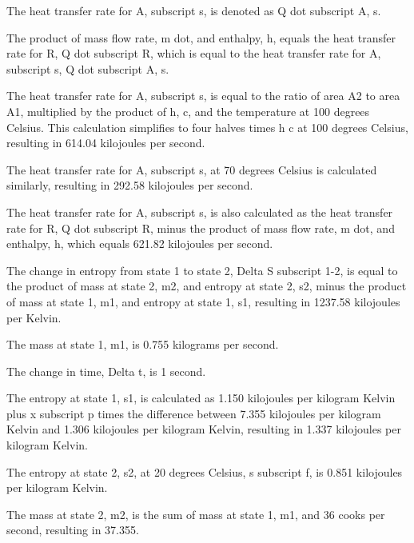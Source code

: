 The heat transfer rate for A, subscript s, is denoted as Q dot subscript A, s.

The product of mass flow rate, m dot, and enthalpy, h, equals the heat transfer rate for R, Q dot subscript R, which is equal to the heat transfer rate for A, subscript s, Q dot subscript A, s.

The heat transfer rate for A, subscript s, is equal to the ratio of area A2 to area A1, multiplied by the product of h, c, and the temperature at 100 degrees Celsius. This calculation simplifies to four halves times h c at 100 degrees Celsius, resulting in 614.04 kilojoules per second.

The heat transfer rate for A, subscript s, at 70 degrees Celsius is calculated similarly, resulting in 292.58 kilojoules per second.

The heat transfer rate for A, subscript s, is also calculated as the heat transfer rate for R, Q dot subscript R, minus the product of mass flow rate, m dot, and enthalpy, h, which equals 621.82 kilojoules per second.

The change in entropy from state 1 to state 2, Delta S subscript 1-2, is equal to the product of mass at state 2, m2, and entropy at state 2, s2, minus the product of mass at state 1, m1, and entropy at state 1, s1, resulting in 1237.58 kilojoules per Kelvin.

The mass at state 1, m1, is 0.755 kilograms per second.

The change in time, Delta t, is 1 second.

The entropy at state 1, s1, is calculated as 1.150 kilojoules per kilogram Kelvin plus x subscript p times the difference between 7.355 kilojoules per kilogram Kelvin and 1.306 kilojoules per kilogram Kelvin, resulting in 1.337 kilojoules per kilogram Kelvin.

The entropy at state 2, s2, at 20 degrees Celsius, s subscript f, is 0.851 kilojoules per kilogram Kelvin.

The mass at state 2, m2, is the sum of mass at state 1, m1, and 36 cooks per second, resulting in 37.355.
